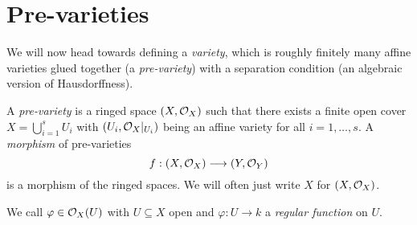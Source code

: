 \section{Pre-varieties}

\begin{remark}
  We will now head towards defining
  a \emph{variety}, which is roughly
  finitely many affine varieties glued
  together (a \emph{pre-variety}) with a separation
  condition (an algebraic version of
  Hausdorffness).
\end{remark}

\begin{definition}
  A \emph{pre-variety} is a ringed
  space $(X, \mathcal{O}_X)$ such that
  there exists a finite open cover
  $X = \bigcup_{i = 1}^s U_i$ with
  $(U_i, \mathcal{O}_X|_{U_i})$ being an
  affine variety for all $i = 1, \dots, s$.
  A \emph{morphism} of pre-varieties
  \[
    f : (X, \mathcal{O}_X) \longrightarrow (Y, \mathcal{O}_Y)
  \]
  is a morphism of the ringed spaces.
  We will often just write
  $X$ for $(X, \mathcal{O}_X)$.
\end{definition}

\begin{remark}
  We call $\varphi \in \mathcal{O}_X(U)$ with
  $U \subseteq X$ open and
  $\varphi : U \to k$ a \emph{regular function}
  on $U$.
\end{remark}

